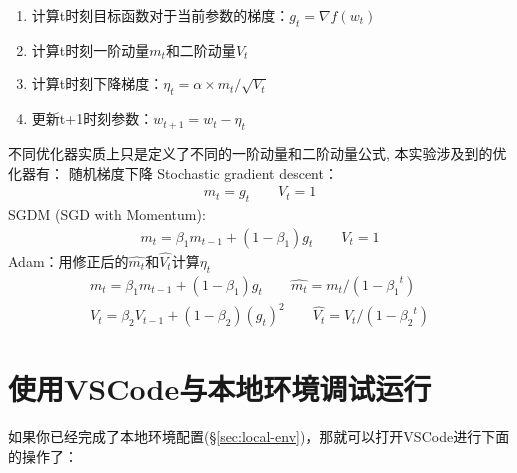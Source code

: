 \begin{enumerate}
    \item 计算t时刻目标函数对于当前参数的梯度：$g_t = \nabla f(w_t)$
    \item 计算t时刻一阶动量$m_t$和二阶动量$V_t$
    \item 计算t时刻下降梯度：$\eta_t = \alpha \times m_t / \sqrt{V_t}$
    \item 更新t+1时刻参数：$w_{t+1} = w_t - \eta_t$
\end{enumerate}
不同优化器实质上只是定义了不同的一阶动量和二阶动量公式, 本实验涉及到的优化器有：
随机梯度下降 Stochastic gradient descent：
\begin{align} 
m_t = g_t \qquad V_t = 1
\end{align}
SGDM (SGD with Momentum):
\begin{align}
m_t = \beta_1 m_{t-1} + (1-\beta_1) g_t \qquad V_t = 1
\end{align}
Adam：用修正后的$\hat{m_t}$和$\hat{V_t}$计算$\eta_t$
\begin{align} %
    m_t = \beta_1 m_{t-1} + (1-\beta_1) g_t  \qquad \hat{m_t} = m_t/(1-{\beta_{1} }^{t})  \\
    V_t = \beta_2 V_{t-1} + (1-\beta_2) (g_t)^2 \qquad \hat{V_t} = V_t/(1-{\beta_{2} }^{t}) 
\end{align}


\section{使用VSCode与本地环境调试运行}\label{sec:task1-local-debug}

如果你已经完成了本地环境配置(\S\ref{sec:local-env})，那就可以打开VSCode进行下面的操作了：

